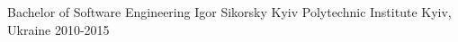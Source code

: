 

\begin{cventries}

  \cventry
    {Bachelor of Software Engineering} %
    {Igor Sikorsky Kyiv Polytechnic Institute} %
    {Kyiv, Ukraine} %
    {2010-2015} %
    {}

\end{cventries}

